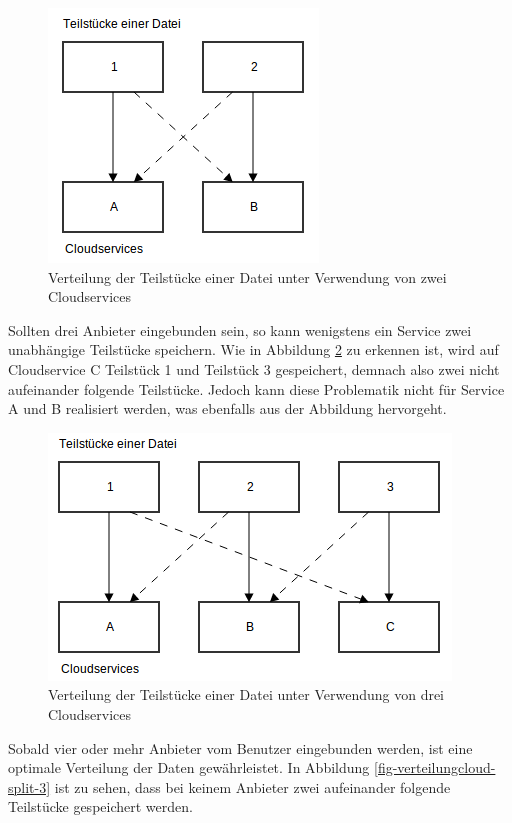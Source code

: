 \begin{figure}[H]
  \centering
  \includegraphics[scale=0.5]{resources/Bilder_Kapitel_4/split_1.png}
  \caption{Verteilung der Teilstücke einer Datei unter Verwendung von zwei Cloudservices}
  \label{fig-verteilungcloud-split-1}
\end{figure}

Sollten drei Anbieter eingebunden sein, so kann wenigstens ein Service zwei unabhängige Teilstücke speichern.
Wie in Abbildung \ref{fig-verteilungcloud-split-2} zu erkennen ist, wird auf Cloudservice C Teilstück 1 und Teilstück 3 gespeichert, demnach also zwei nicht aufeinander folgende Teilstücke.
Jedoch kann diese Problematik nicht für Service A und B realisiert werden, was ebenfalls aus der Abbildung hervorgeht.

\begin{figure}[H]
  \centering
  \includegraphics[scale=0.5]{resources/Bilder_Kapitel_4/split_2.png}
  \caption{Verteilung der Teilstücke einer Datei unter Verwendung von drei Cloudservices}
  \label{fig-verteilungcloud-split-2}
\end{figure}

Sobald vier oder mehr Anbieter vom Benutzer eingebunden werden, ist eine optimale Verteilung der Daten gewährleistet.
In Abbildung \ref{fig-verteilungcloud-split-3} ist zu sehen, dass bei keinem Anbieter zwei aufeinander folgende Teilstücke gespeichert werden.

